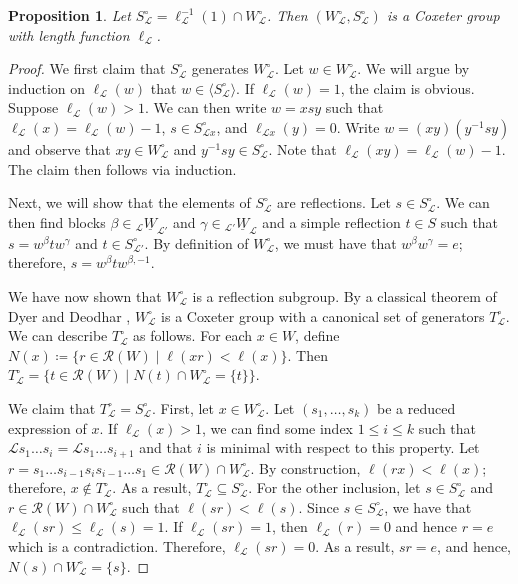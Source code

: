 \documentclass{amsart}
\newcommand{\scrL}{\mathcal{L}}
\newcommand{\uW}[2]{{}_{#1}\underline{W}_{#2}}
\newtheorem{proposition}[subsubsection]{Proposition}
\theoremstyle{definition}
\numberwithin{equation}{subsection}
\begin{document}
\begin{proposition}\label{prop:endo_gps_are_coxeter_gps}
    Let $S_{\scrL}^\circ = \ell_{\scrL}^{-1} (1) \cap W_{\scrL}^{\circ}$. Then $(W_{\scrL}^\circ, S_{\scrL}^\circ)$ is a Coxeter group with length function $\ell_{\scrL}$.
\end{proposition}
\begin{proof}
    We first claim that $S_{\scrL}^{\circ}$ generates $W_{\scrL}^{\circ}$.
    Let $w \in W_{\scrL}^{\circ}$. We will argue by induction on $\ell_{\scrL} (w)$ that $w \in \langle S_{\scrL}^{\circ} \rangle$.
    If $\ell_{\scrL} (w) = 1$, the claim is obvious. Suppose $\ell_{\scrL} (w) > 1$. We can then write $w = xsy$ such that $\ell_{\scrL} (x) = \ell_{\scrL} (w) - 1$, $s \in S_{\scrL x}^{\circ}$, and $\ell_{\scrL x} (y) = 0$.
    Write $w = (xy)(y^{-1} s y)$ and observe that $xy \in W_{\scrL}^{\circ}$ and $y^{-1} sy \in S_{\scrL}^{\circ}$. Note that $\ell_{\scrL} (xy) = \ell_{\scrL} (w) - 1$. The claim then follows via induction.
    
    Next, we will show that the elements of $S_{\scrL}^{\circ}$ are reflections. 
    Let $s \in S_{\scrL}^{\circ}$. We can then find blocks $\beta \in \uW{\scrL}{\scrL'}$ and $\gamma \in \uW{\scrL'}{\scrL}$ and a simple reflection $t \in S$ such that $s = w^{\beta} t w^{\gamma}$ and $t \in S_{\scrL'}^{\circ}$.
    By definition of $W_{\scrL}^{\circ}$, we must have that $w^{\beta} w^{\gamma} = e$; therefore, $s = w^{\beta} t w^{\beta, -1}$.

    We have now shown that $W_{\scrL}^{\circ}$ is a reflection subgroup. By a classical theorem of Dyer \cite{Dyer} and Deodhar \cite{Deodhar}, $W_{\scrL}^{\circ}$ is a Coxeter group with a canonical set of generators $T_{\scrL}^{\circ}$.
    We can describe $T_{\scrL}^{\circ}$ as follows.
    For each $x \in W$, define $N(x) \coloneq \{r \in \mathscr{R} (W) \mid \ell (xr) < \ell (x) \}$. Then $T_{\scrL}^{\circ} = \{ t \in \mathscr{R} (W) \mid N(t) \cap W_{\scrL}^{\circ} = \{t\} \}$.
    
    We claim that $T_{\scrL}^{\circ} = S_{\scrL}^{\circ}$.
    First, let $x \in W_{\scrL}^{\circ}$. Let  $(s_1, \ldots, s_k)$ be a reduced expression of $x$. If $\ell_{\scrL} (x) > 1$, we can find some index $1 \leq i \leq k$ such that $\scrL s_1 \ldots s_i =  \scrL s_{1} \ldots s_{i+1}$ and that $i$ is minimal with respect to this property.
    Let $r = s_1 \ldots s_{i-1} s_i s_{i-1} \ldots s_1 \in \mathscr{R} (W) \cap W_{\scrL}^{\circ}$. By construction, $\ell (rx) < \ell (x)$; therefore, $x \notin T_{\scrL}^{\circ}$.
    As a result, $T_{\scrL}^{\circ} \subseteq S_{\scrL}^{\circ}$.
    For the other inclusion, let $s \in S_{\scrL}^{\circ}$ and $r \in \mathscr{R} (W) \cap W_{\scrL}^{\circ}$ such that $\ell (sr) < \ell (s)$. Since $s \in S_{\scrL}^{\circ}$, we have that $\ell_{\scrL} (sr) \leq \ell_{\scrL} (s) = 1$. 
    If $\ell_{\scrL} (sr) = 1$, then $\ell_{\scrL} (r) = 0$ and hence $r=e$ which is a contradiction. Therefore, $\ell_{\scrL} (sr) = 0$.
    As a result, $sr = e$, and hence, $N (s) \cap W_{\scrL}^{\circ} = \{s\}$.
\end{proof}
\end{document}
